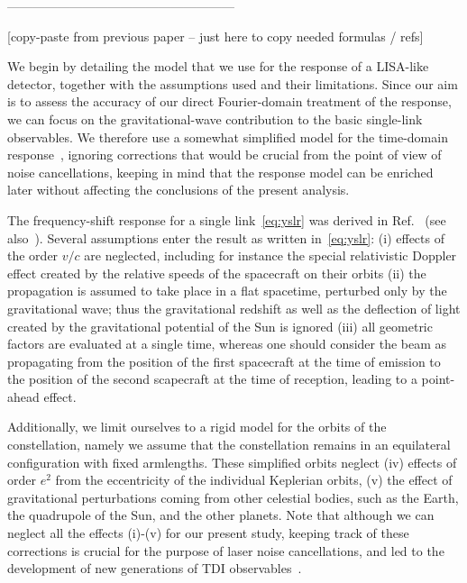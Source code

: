 \documentclass[aps,showpacs,twocolumn,prd,superscriptaddress,nofootinbib]{revtex4-1}
\newcommand{\SM}[1]{{\color{Blue} #1}}
\begin{document}
\SM{------------------------------------------------------}

\SM{[copy-paste from previous paper -- just here to copy needed formulas / refs]}

We begin by detailing the model that we use for the response of a LISA-like detector, together with the assumptions used and their limitations. Since our aim is to assess the accuracy of our direct Fourier-domain treatment of the response, we can focus on the gravitational-wave contribution to the basic single-link observables. We therefore use a somewhat simplified model for the time-domain response~\cite{Krolak+04}, ignoring corrections that would be crucial from the point of view of noise cancellations, keeping in mind that the response model can be enriched later without affecting the conclusions of the present analysis.

The frequency-shift response for a single link~\eqref{eq:yslr} was derived in Ref.~\cite{EW75} (see also~\cite{CR02, RCP04, Finn08, Cornish09}). Several assumptions enter the result as written in~\eqref{eq:yslr}: (i) effects of the order $v/c$ are neglected, including for instance the special relativistic Doppler effect created by the relative speeds of the spacecraft on their orbits (ii) the propagation is assumed to take place in a flat spacetime, perturbed only by the gravitational wave; thus the gravitational redshift as well as the deflection of light created by the gravitational potential of the Sun is ignored (iii) all geometric factors are evaluated at a single time, whereas one should consider the beam as propagating from the position of the first spacecraft at the time of emission to the position of the second scapecraft at the time of reception, leading to a point-ahead effect.

Additionally, we limit ourselves to a rigid model for the orbits of the constellation, namely we assume that the constellation remains in an equilateral configuration with fixed armlengths. These simplified orbits neglect (iv) effects of order $e^{2}$ from the eccentricity of the individual Keplerian orbits, (v) the effect of gravitational perturbations coming from other celestial bodies, such as the Earth, the quadrupole of the Sun, and the other planets. Note that although we can neglect all the effects (i)-(v) for our present study, keeping track of these corrections is crucial for the purpose of laser noise cancellations, and led to the development of new generations of TDI observables~\cite{Tintoliving}.
\end{document}
